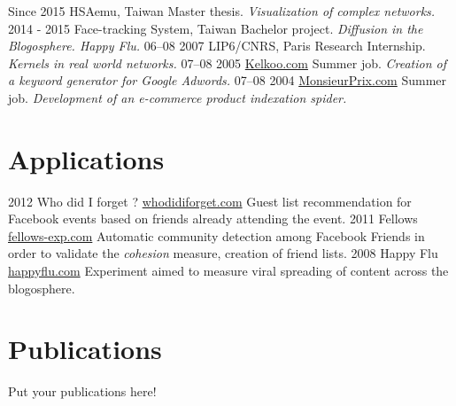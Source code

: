 \documentclass[]{friggeri-cv}
\begin{document}
\begin{entrylist}
  \entry
    {Since 2015}
    {HSAemu, Taiwan}
    {Master thesis.}
    {\emph{Visualization of complex networks.}}
  \entry
    {2014 - 2015}
    {Face-tracking System, Taiwan}
    {Bachelor project.}
    {\emph{Diffusion in the Blogosphere. Happy Flu.}}
  \entry
    {06–08 2007}
    {LIP6/CNRS, Paris}
    {Research Internship.}
    {\emph{Kernels in real world networks.}}
  \entry
    {07–08 2005}
    {\href{http://www.kelkoo.com}{Kelkoo.com}}
    {Summer job.}
    {\emph{Creation of a keyword generator for Google Adwords.}}
  \entry
    {07–08 2004}
    {\href{http://www.monsieurprix.com}{MonsieurPrix.com}}
    {Summer job.}
    {\emph{Development of an e-commerce product indexation spider.}}
\end{entrylist}
\section{Applications}

\begin{entrylist}
  \entry
    {2012}
    {Who did I forget ?}
    {\href{http://whodidiforget.com}{whodidiforget.com}}
    {Guest list recommendation for Facebook events based on friends already attending the event.}
  \entry
    {2011}
    {Fellows}
    {\href{http://fellows-exp.com}{fellows-exp.com}}
    {Automatic community detection among Facebook Friends in order to validate the \emph{cohesion} measure, creation of friend lists.}
  \entry
    {2008}
    {Happy Flu}
    {\href{http://happyflu.com}{happyflu.com}}
    {Experiment aimed to measure viral spreading of content across the blogosphere.}
\end{entrylist}

\section{Publications}

Put your publications here!

% 
\end{document}
